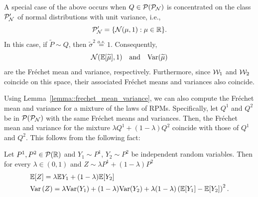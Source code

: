 \begin{remark}\label{remark:frechet_mean_variance_special_case_variance_1}
A special case of the above occurs when $Q \in \mathcal{P}(\mathcal{P}_{\mathcal{N}})$ is concentrated on the class $\mathcal{P}_{\mathcal{N}}'$ of normal distributions with unit variance, i.e.,
\[
\mathcal{P}_{\mathcal{N}}' = \{ \mathcal{N}(\mu, 1) : \mu \in \mathbb{R} \}.
\]
In this case, if $\widetilde{P} \sim Q$, then $\widetilde{\sigma}^2 \overset{a.s.}{=} 1$. Consequently, 
\[
\mathcal{N}(\mathbb{E} [\widetilde{\mu}], 1) \quad \text{and} \quad \mathrm{Var}(\widetilde{\mu})
\]
are the Fr\'{e}chet mean and variance, respectively. Furthermore, since $\mathcal{W}_1$ and $\mathcal{W}_2$ coincide on this space, their associated Fr\'{e}chet means and variances also coincide.
\end{remark}

\begin{remark}\label{remark:frechet_mean_variance_mixture_of_laws}
Using Lemma~\ref{lemma::frechet_mean_variance}, we can also compute the Fr\'{e}chet mean and variance for a mixture of the laws of RPMs. Specifically, let $Q^1$ and $Q^2$ be in $\mathcal{P}(\mathcal{P}_{\mathcal{N}})$ with the same Fr\'echet means and variances. Then, the Fr\'{e}chet mean and variance for the mixture $\lambda Q^1 + (1-\lambda)Q^2$ coincide with those of $Q^1$ and $Q^2$. This follows from the following fact: 

Let $P^1,P^2 \in \mathcal{P}(\mathbb{R})$ and $Y_1 \sim P^1$, $Y_2 \sim P^2$ be independent random variables. Then for every $\lambda \in (0,1)$ and $Z \sim \lambda P^1 + (1-\lambda) P^2$
\begin{align*}
& \mathbb{E} [Z] = \lambda \mathbb{E} Y_1 + (1-\lambda)\mathbb{E} [Y_2] \\
& \mathrm{Var}\left( Z \right) = \lambda \mathrm{Var}(Y_1) + (1-\lambda)\mathrm{Var}(Y_2) + \lambda (1 - \lambda)\left(\mathbb{E} [Y_1] - \mathbb{E} [Y_2] \right)^2.
\end{align*}
\end{remark}




